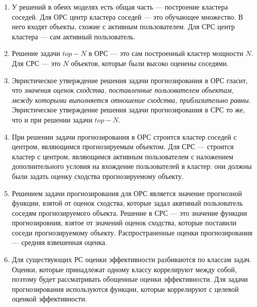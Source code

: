 \documentclass[a4paper,14pt]{proc}
\begin{document}
{\begin{enumerate}
Будем говорить, что пользователи схожи, если разница между оценками сходства, которые они задали одним и тем же объектам, меньше некоторого малого
эпсилон 0. 

В СРС используется утверждение, которое гласит, что {\it если пользователи схожи по данным обучающей выборки, то они будут схожи по данным тестовой выборки}.

\item У решений в обеих моделях есть общая часть --- построение кластера соседей. 
Для ОРС центр кластера соседей --- это обучающее множество. 
В него входят объекты, схожие с активным пользователем. Для СРС центр кластера --- сам активный пользователь.

\item Решение задачи $top-N$ в ОРС --- это сам построенный кластер мощности $N$. Для СРС --- это $N$ объектов, которые были высоко 
оценены соседями.

\item Эвристическое утверждение решения задачи прогнозирования в ОРС гласит, что  
{\it значения оценок сходства, поставленные пользователем объектам, между которыми выполняется отношение сходства, приблизительно равны}. 
Эвристическое утверждение решения задачи прогнозирования 
в СРС то же, что и при решении задачи $top-N$.

\item При решении задачи прогнозирования в ОРС строится кластер соседей с центром, являющимся прогнозируемым объектом.
Для СРС --- строится кластер с центром, являющимся активным пользователем с наложением дополнительного условия на вхождение
пользователей в кластер: они должны были задать оценку сходства прогнозируемому объекту.

\item Решением задачи прогнозирования для ОРС является значение прогнозной функции, взятой от оценок сходства, которые 
задал аквтиный пользователь соседям прогнозируемого объекта. Решение в СРС --- это значение функции прогнозировния, взятое
от значений оценок сходства, которые поставили соседи прогнозируемому объекту. 
Распространенные оценки прогнозирования --- средняя взвешенная оценка.

\item Для существующих РС оценки эффективности разбиваются по классам задач. Оценки, которые принадлежат одному классу коррелируют 
между собой, поэтому будет рассматривать обощенные оценки эффективности. Для задачи прогнозирования используются функции, которые 
коррелируют с целевой оценкой эффективности.


\end{enumerate}}
\end{document}

